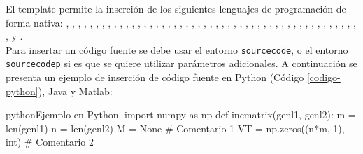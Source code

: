 	El template permite la inserción de los siguientes lenguajes de programación de forma nativa: , ,  , , , , , , , , , , , , , , , , , , , , , , , , , , , , , , , , , , , , , , , , , , , , , , , ,  y . \\
		
	Para insertar un código fuente se debe usar el entorno \texttt{sourcecode}, o el entorno \texttt{sourcecodep} si es que se quiere utilizar parámetros adicionales. A continuación se presenta un ejemplo de inserción de código fuente en Python (Código \ref{codigo-python}), Java y Matlab:

\begin{sourcecode}[\label{codigo-python}]{python}{Ejemplo en Python.}
import numpy as np
def incmatrix(genl1, genl2):
	m = len(genl1)
	n = len(genl2)
	M = None # Comentario 1
	VT = np.zeros((n*m, 1), int) # Comentario 2
\end{sourcecode}

